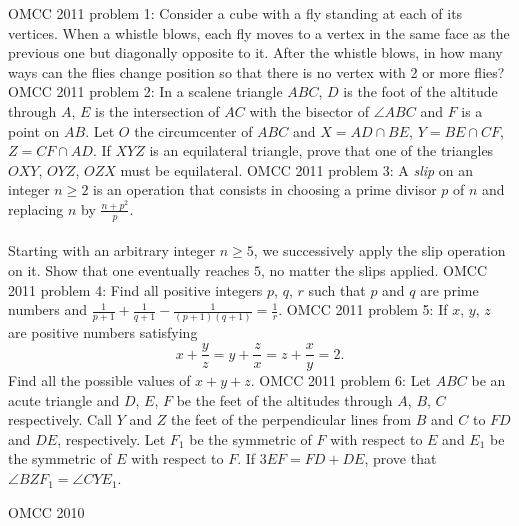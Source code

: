 OMCC 2011 problem 1:  Consider a cube with a fly standing at each of its vertices. When a whistle blows, each fly moves to a vertex in the same face as the previous one but diagonally opposite to it. After the whistle blows, in how many ways can the flies change position so that there is no vertex with 2 or more flies? 
OMCC 2011 problem 2:  In a scalene triangle $ABC$, $D$ is the foot of the altitude through $A$, $E$ is the intersection of $AC$ with the bisector of $\angle ABC$ and $F$ is a point on $AB$. Let $O$ the circumcenter of $ABC$ and $X=AD\cap BE$, $Y=BE\cap CF$, $Z=CF \cap AD$. If $XYZ$ is an equilateral triangle, prove that one of the triangles $OXY$, $OYZ$, $OZX$ must be equilateral. 
OMCC 2011 problem 3:  A \textit{slip} on an integer $n\geq 2$ is an operation that consists in choosing a prime divisor $p$ of $n$ and replacing $n$ by $\frac{n+p^2}{p}.$ \\\\
Starting with an arbitrary integer $n\geq 5$, we successively apply the slip operation on it. Show that one eventually reaches $5$, no matter the slips applied. 
OMCC 2011 problem 4:  Find all positive integers $p$, $q$, $r$ such that $p$ and $q$ are prime numbers and  $\frac{1}{p+1}+\frac{1}{q+1}-\frac{1}{(p+1)(q+1)} = \frac{1}{r}.$ 
OMCC 2011 problem 5:  If $x$, $y$, $z$ are positive numbers satisfying
\[ x+\frac{y}{z}=y+\frac{z}{x}=z+\frac{x}{y}=2. \]
Find all the possible values of $x+y+z$. 
OMCC 2011 problem 6:  Let $ABC$ be an acute triangle and $D$, $E$, $F$ be the feet of the altitudes through $A$, $B$, $C$ respectively.  Call $Y$ and $Z$ the feet of the perpendicular lines from $B$ and $C$ to $FD$ and $DE$, respectively. Let $F_1$ be the symmetric of $F$ with respect to $E$ and $E_1$ be the symmetric of $E$ with respect to $F$. If $3EF=FD+DE$, prove that $\angle BZF_1=\angle CYE_1$. 

OMCC 2010 

